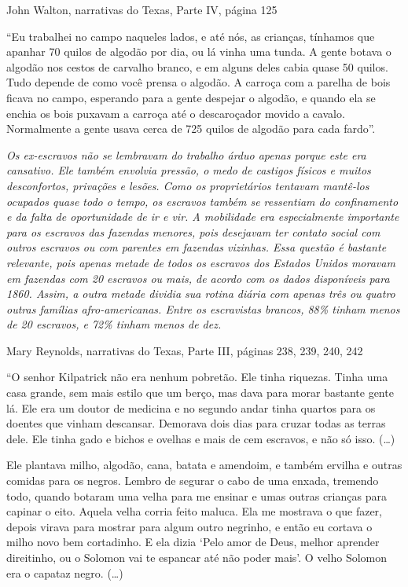 John Walton, narrativas do Texas, Parte IV, página 125

``Eu trabalhei no campo naqueles lados, e até nós, as crianças, tínhamos
que apanhar 70 quilos de algodão por dia, ou lá vinha uma tunda. A gente
botava o algodão nos cestos de carvalho branco, e em alguns deles cabia
quase 50 quilos. Tudo depende de como você prensa o algodão. A carroça
com a parelha de bois ficava no campo, esperando para a gente despejar o
algodão, e quando ela se enchia os bois puxavam a carroça até o
descaroçador movido a cavalo. Normalmente a gente usava cerca de 725
quilos de algodão para cada fardo''.

\emph{Os ex-escravos não se lembravam do trabalho árduo apenas porque
este era cansativo. Ele também envolvia pressão, o medo de castigos
físicos e muitos desconfortos, privações e lesões. Como os proprietários
tentavam mantê-los ocupados quase todo o tempo, os escravos também se
ressentiam do confinamento e da falta de oportunidade de ir e vir. A
mobilidade era especialmente importante para os escravos das fazendas
menores, pois desejavam ter contato social com outros escravos ou com
parentes em fazendas vizinhas. Essa questão é bastante relevante, pois
apenas metade de todos os escravos dos Estados Unidos moravam em
fazendas com 20 escravos ou mais, de acordo com os dados disponíveis
para 1860. Assim, a outra metade dividia sua rotina diária com apenas
três ou quatro outras famílias afro-americanas. Entre os escravistas
brancos, 88\% tinham menos de 20 escravos, e 72\% tinham menos de dez. }

Mary Reynolds, narrativas do Texas, Parte III, páginas 238, 239, 240,
242

``O senhor Kilpatrick não era nenhum pobretão. Ele tinha riquezas. Tinha
uma casa grande, sem mais estilo que um berço, mas dava para morar
bastante gente lá. Ele era um doutor de medicina e no segundo andar
tinha quartos para os doentes que vinham descansar. Demorava dois dias
para cruzar todas as terras dele. Ele tinha gado e bichos e ovelhas e
mais de cem escravos, e não só isso. (\ldots{})

Ele plantava milho, algodão, cana, batata e amendoim, e também ervilha e
outras comidas para os negros. Lembro de segurar o cabo de uma enxada,
tremendo todo, quando botaram uma velha para me ensinar e umas outras
crianças para capinar o eito. Aquela velha corria feito maluca. Ela me
mostrava o que fazer, depois virava para mostrar para algum outro
negrinho, e então eu cortava o milho novo bem cortadinho. E ela dizia
`Pelo amor de Deus, melhor aprender direitinho, ou o Solomon vai te
espancar até não poder mais'. O velho Solomon era o capataz negro.
(\ldots{})

